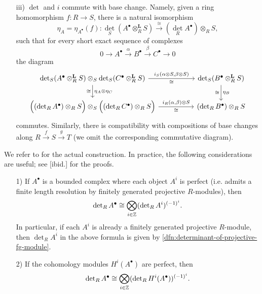 \documentclass{article}
\numberwithin{equation}{section}
\begin{document}
\begin{appendices}
\begin{theorem}
\begin{enumerate}
  \item[iii)] $\det$ and $i$ commute with base change. Namely, given a ring
    homomorphism $f\colon R\to S$, there is a natural isomorphism
    \[ \eta_A = \eta_{A^\bullet} (f)\colon
      \det_S (A^\bullet \otimes_R^\mathbf{L} S) \xrightarrow{\cong}
      (\det_R A^\bullet) \otimes_R S, \]
    such that for every short exact sequence of complexes
    \[ 0 \to A^\bullet \xrightarrow{\alpha} B^\bullet \xrightarrow{\beta}
      C^\bullet \to 0 \]
    the diagram
    \[ \begin{tikzcd}[column sep=5em]
        \det_S (A^\bullet \otimes_R^\mathbf{L} S) \otimes_S \det_S (C^\bullet \otimes_R^\mathbf{L} S) \ar{d}{\eta_A \otimes \eta_C}[swap]{\cong}\ar{r}{i_S (\alpha\otimes S, \beta\otimes S)}[swap]{\cong} & \det_S (B^\bullet \otimes_R^\mathbf{L} S) \ar{d}{\eta_B}[swap]{\cong} \\
        \Bigl((\det_R A^\bullet) \otimes_R S\Bigr) \otimes_S \Bigl((\det_R C^\bullet) \otimes_R S\Bigr) \ar{r}{i_R (\alpha,\beta) \otimes S}[swap]{\cong} & (\det_R B^\bullet) \otimes_R S
      \end{tikzcd} \]
    commutes. Similarly, there is compatibility with compositions of base
    changes along $R \xrightarrow{f} S \xrightarrow{g} T$ (we omit the
    corresponding commutative diagram).
  \end{enumerate}
\end{theorem}

\begin{remark}
  We refer to \cite{Knudsen-Mumford-1976} for the actual construction.
  In practice, the following considerations are useful; see [ibid.] for the
  proofs.

  \begin{enumerate}
  \item[1)] If $A^\bullet$ is a bounded complex where each object $A^i$ is
    perfect (i.e. admits a finite length resolution by finitely generated
    projective $R$-modules), then
    $$\operatorname{det}_R A^\bullet \cong \bigotimes_{i\in \mathbb{Z}} (\operatorname{det}_R A^i)^{(-1)^i}.$$
    In particular, if each $A^i$ is already a finitely generated projective
    $R$-module, then $\det_R A^i$ in the above formula is given by
    \ref{dfn:determinant-of-projective-fg-module}.

  \item[2)] If the cohomology modules $H^i (A^\bullet)$ are perfect, then
    \[ \operatorname{det}_R A^\bullet \cong
      \bigotimes_{i\in \mathbb{Z}} (\operatorname{det}_R H^i (A^\bullet))^{(-1)^i}. \]
  \end{enumerate}
\end{remark}


\end{appendices}
\end{document}
